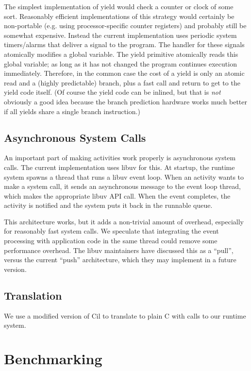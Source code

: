 \documentclass[9pt,preprint]{sigplanconf}
\begin{document}
The simplest implementation of yield would check a counter or clock of some sort.
Reasonably efficient implementations of this strategy would certainly be non-portable (e.g. using processor-specific counter registers) and probably still be somewhat expensive.
Instead the current \charcoal{} implementation uses periodic system timers/alarms that deliver a signal to the program.
The handler for these signals atomically modifies a global variable.
The yield primitive atomically reads this global variable; as long as it has not changed the program continues execution immediately.
Therefore, in the common case the cost of a yield is only an atomic read and a (highly predictable) branch, plus a fast call and return to get to the yield code itself.
(Of course the yield code can be inlined, but that is \emph{not} obviously a good idea because the branch prediction hardware works much better if all yields share a single branch instruction.)

\subsection{Asynchronous System Calls}

An important part of making activities work properly is asynchronous system calls.
The current \charcoal{} implementation uses libuv for this.
At startup, the runtime system spawns a thread that runs a libuv event loop.
When an activity wants to make a system call, it sends an asynchronous message to the event loop thread, which makes the appropriate libuv API call.
When the event completes, the activity is notified and the system puts it back in the runnable queue.

This architecture works, but it adds a non-trivial amount of overhead, especially for reasonably fast system calls.
We speculate that integrating the event processing with application code in the same thread could remove some performance overhead.
The libuv maintainers have discussed this as a ``pull'', versus the current ``push'' architecture, which they may implement in a future version.

\subsection{Translation}

We use a modified version of Cil \cite{Necula2002} to translate \charcoal{} to plain C with calls to our runtime system.

\section{Benchmarking}
\end{document}
